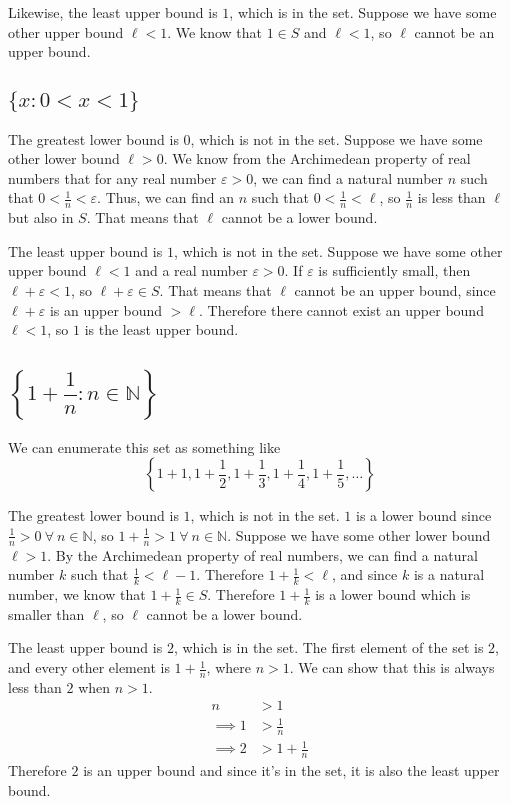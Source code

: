 \documentclass[a4paper]{article}
\begin{document}
Likewise, the least upper bound is $1$, which is in the set. Suppose we have some other upper bound $\ell < 1$. We know that $1 \in S$ and $\ell < 1$, so $\ell$ cannot be an upper bound.

\subsection{$\{x : 0 < x < 1\}$}

The greatest lower bound is $0$, which is not in the set. Suppose we have some other lower bound $\ell > 0$. We know from the Archimedean property of real numbers that for any real number $\varepsilon > 0$, we can find a natural number $n$ such that $0 < \frac{1}{n} < \varepsilon$. Thus, we can find an $n$ such that $0 < \frac{1}{n} < \ell$, so $\frac{1}{n}$ is less than $\ell$ but also in $S$. That means that $\ell$ cannot be a lower bound.

The least upper bound is $1$, which is not in the set. Suppose we have some other upper bound $\ell < 1$ and a real number $\varepsilon > 0$. If $\varepsilon$ is sufficiently small, then $\ell + \varepsilon < 1$, so $\ell + \varepsilon \in S$. That means that $\ell$ cannot be an upper bound, since $\ell + \varepsilon$ is an upper bound $> \ell$. Therefore there cannot exist an upper bound $\ell < 1$, so $1$ is the least upper bound.

\subsection{$\left\{ 1 + \dfrac{1}{n} : n \in \mathbb{N} \right\}$}

We can enumerate this set as something like $$\left\{ 1 + 1, 1 + \frac12, 1 + \frac13, 1 + \frac14, 1 + \frac15, \ldots \right\}$$

The greatest lower bound is $1$, which is not in the set. $1$ is a lower bound since $\frac1n > 0\ \forall\ n \in \mathbb N$, so $1 + \frac1n > 1\ \forall\ n \in \mathbb N$. Suppose we have some other lower bound $\ell > 1$. By the Archimedean property of real numbers, we can find a natural number $k$ such that $\frac1k < \ell - 1$. Therefore $1 + \frac1k < \ell$, and since $k$ is a natural number, we know that $1 + \frac1k \in S$. Therefore $1 + \frac1k$ is a lower bound which is smaller than $\ell$, so $\ell$ cannot be a lower bound.

The least upper bound is $2$, which is in the set. The first element of the set is $2$, and every other element is $1 + \frac1n$, where $n > 1$. We can show that this is always less than $2$ when $n > 1$.
\begin{align*}
	n &> 1\\
	\implies 1 &> \frac1n\\
	\implies 2 &> 1 + \frac1n
\end{align*}
Therefore $2$ is an upper bound and since it's in the set, it is also the least upper bound.
\end{document}
